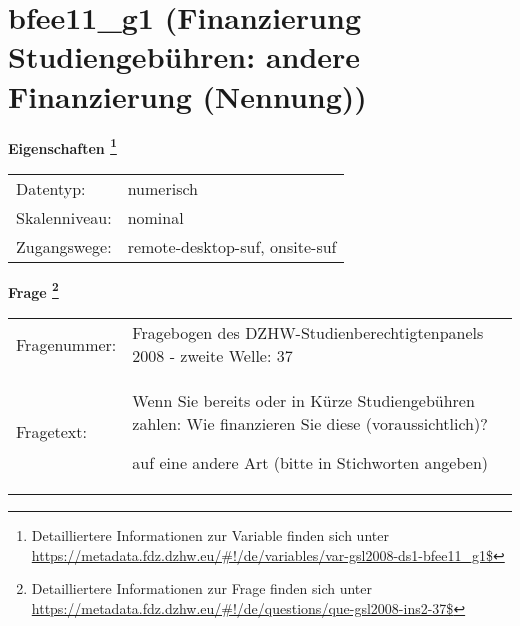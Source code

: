 
    \setcounter{footnote}{0}

    \vspace*{-1.8cm}
	\section{bfee11\_g1 (Finanzierung Studiengebühren: andere Finanzierung (Nennung))}
	\label{section:bfee11_g1}



    \vspace*{0.5cm}
    \noindent\textbf{Eigenschaften
	\footnote{Detailliertere Informationen zur Variable finden sich unter
		\url{https://metadata.fdz.dzhw.eu/\#!/de/variables/var-gsl2008-ds1-bfee11_g1$}}}\\
	\begin{tabularx}{\hsize}{@{}lX}
	Datentyp: & numerisch \\
	Skalenniveau: & nominal \\
	Zugangswege: &
	  remote-desktop-suf, 
	  onsite-suf
 \\
    \end{tabularx}



				\vspace*{0.5cm}
                \noindent\textbf{Frage
	                \footnote{Detailliertere Informationen zur Frage finden sich unter
		              \url{https://metadata.fdz.dzhw.eu/\#!/de/questions/que-gsl2008-ins2-37$}}}\\
				\begin{tabularx}{\hsize}{@{}lX}
					Fragenummer: &
					  Fragebogen des DZHW-Studienberechtigtenpanels 2008 - zweite Welle:
					  37
 \\
					Fragetext: & Wenn Sie bereits oder in Kürze Studiengebühren zahlen: Wie finanzieren Sie diese (voraussichtlich)?\par  auf eine andere Art (bitte in Stichworten angeben) \\
				\end{tabularx}






